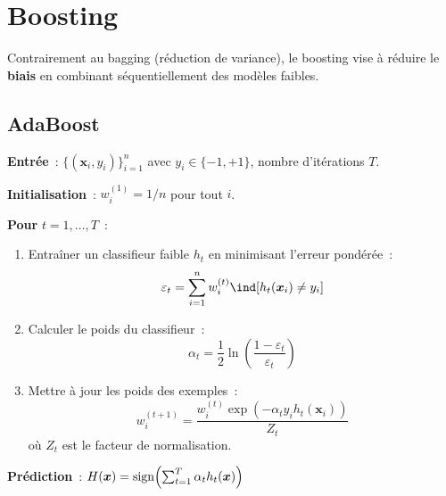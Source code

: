 \section{Boosting}
\label{sec:boosting}

Contrairement au bagging (r\'eduction de variance), le boosting vise \`a
r\'eduire le \textbf{biais} en combinant s\'equentiellement des mod\`eles
faibles.

\subsection{AdaBoost}

\begin{algorithme}[title=\textbf{Algorithme AdaBoost}]
\textbf{Entr\'ee}~: $\{(\bm{x}_i, y_i)\}_{i=1}^n$ avec $y_i \in \{-1, +1\}$,
nombre d'it\'erations $T$.

\textbf{Initialisation}~: $w_i^{(1)} = 1/n$ pour tout $i$.

\textbf{Pour} $t = 1, \ldots, T$~:
\begin{enumerate}
  \item Entra\^iner un classifieur faible $h_t$ en minimisant l'erreur
    pond\'er\'ee~:
    \begin{equation}
      \varepsilon_t = \sum_{i=1}^n w_i^{(t)} \ind[h_t(\bm{x}_i) \neq y_i]
    \end{equation}
  \item Calculer le poids du classifieur~:
    \begin{equation}
      \alpha_t = \frac{1}{2}\ln\!\left(\frac{1 - \varepsilon_t}{\varepsilon_t}
      \right)
      \label{eq:adaboost-alpha}
    \end{equation}
  \item Mettre \`a jour les poids des exemples~:
    \begin{equation}
      w_i^{(t+1)} = \frac{w_i^{(t)} \exp(-\alpha_t y_i h_t(\bm{x}_i))}{Z_t}
      \label{eq:adaboost-weights}
    \end{equation}
    o\`u $Z_t$ est le facteur de normalisation.
\end{enumerate}
\textbf{Pr\'ediction}~:
$H(\bm{x}) = \mathrm{sign}\!\left(\sum_{t=1}^T \alpha_t h_t(\bm{x})\right)$
\end{algorithme}

